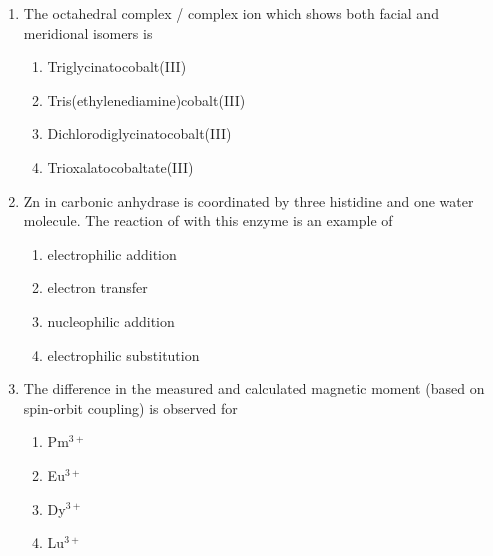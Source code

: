 \documentclass[journal,12pt,onecolumn]{IEEEtran}
\theoremstyle{remark}
\begin{document}
\begin{enumerate}
\begin{multicols}{4}
\begin{enumerate}
     \item   Zn
     \item   Cu
     \item   Mn
     \item   Fe
\end{enumerate}
\end{multicols}
 

\item The octahedral complex / complex ion which shows both facial and meridional isomers is \hfill{}
\begin{multicols}{2}
   
\begin{enumerate}
     \item   Triglycinatocobalt(III)
     \item   Tris(ethylenediamine)cobalt(III)
     \item   Dichlorodiglycinatocobalt(III)
     \item   Trioxalatocobaltate(III)
\end{enumerate}
\end{multicols}
 

\item Zn in carbonic anhydrase is coordinated by three histidine and one water molecule. The reaction of  with this enzyme is an example of \hfill{}
\begin{multicols}{4}
   

\begin{enumerate}
     \item   electrophilic addition
     \item   electron transfer
     \item   nucleophilic addition
     \item   electrophilic substitution
\end{enumerate}

\end{multicols}
 

\item The difference in the measured and calculated magnetic moment (based on spin-orbit coupling) is observed for \hfill{}
\begin{multicols}{2}
\begin{enumerate}[leftmargin=*,labelsep=1em]
     \item   Pm$^{3+}$
     \item   Eu$^{3+}$
     \item   Dy$^{3+}$
     \item   Lu$^{3+}$
\end{enumerate}
\end{multicols}
 


\end{enumerate}
\end{document}
